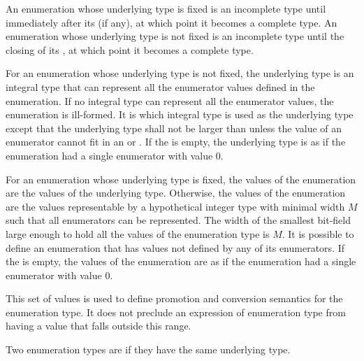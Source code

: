 \pnum
An enumeration whose underlying type is fixed is an incomplete type
until immediately after its
 (if any), at which point it becomes a complete type.
An enumeration whose underlying type is not fixed is an incomplete type
until the closing \tcode{\}} of its
, at which point it becomes a complete type.

\pnum
For an enumeration whose underlying type is not fixed,
the underlying type
is an
integral type that can represent all the enumerator values defined in
the enumeration. If no integral type can represent all the enumerator
values, the enumeration is ill-formed. It is 
which integral type is used as the underlying type
except that the underlying type shall not be larger than 
unless the value of an enumerator cannot fit in an  or
. If the  is empty, the
underlying type is as if the enumeration had a single enumerator with
value 0.

\pnum
{}%
For an enumeration whose underlying type is fixed, the values of
the enumeration are the values of the underlying type. Otherwise,
the values of the enumeration are the values representable by
a hypothetical integer type with minimal width $M$
such that all enumerators can be represented.
The width of the smallest bit-field large enough to hold all the values of the
enumeration type is $M$.
It is possible to define an enumeration that has values not defined by
any of its enumerators. If the  is empty, the
values of the enumeration are as if the enumeration had a single enumerator with
value 0.
\begin{footnote}
This set of values is used to define promotion and
conversion semantics for the enumeration type. It does not preclude an
expression of enumeration type from having a value that falls outside
this range.
\end{footnote}

\pnum
Two enumeration types are 
if they have the same underlying type.

